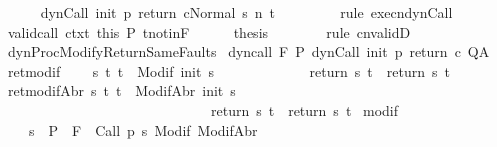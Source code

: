 \begin{isabellebody}
\ \ \ \ \isamarkupfalse%
\ {\isachardoublequoteopen}{\isasymGamma}{\isasymturnstile}{\isasymlangle}dynCall\ init\ p\ return{\isacharprime}\ c{\isacharcomma}Normal\ s{\isasymrangle}\ {\isacharequal}n{\isasymRightarrow}\ t{\isachardoublequoteclose}\ \isanewline
\ \ \ \ \ \ \isamarkupfalse%
\ {\isacharparenleft}rule\ execn{\isacharunderscore}dynCall{\isacharparenright}\isanewline
\ \ \ \ \isamarkupfalse%
\ valid{\isacharunderscore}call\ ctxt\ this\ P\ t{\isacharunderscore}notin{\isacharunderscore}F\isanewline
\ \ \ \ \isamarkupfalse%
\ {\isacharquery}thesis\isanewline
\ \ \ \ \ \ \isamarkupfalse%
\ {\isacharparenleft}rule\ cnvalidD{\isacharparenright}\isanewline
\ \ \isamarkupfalse%
\isanewline
{}\isamarkupfalse%
%
\endisatagproof
{\isafoldproof}%
%
\isadelimproof
\isanewline
%
\endisadelimproof
\isanewline
{}\isamarkupfalse%
\ dynProcModifyReturnSameFaults{\isacharcolon}\isanewline
{}\ dyn{\isacharunderscore}call{\isacharcolon}\ {\isachardoublequoteopen}{\isasymGamma}{\isacharcomma}{\isasymTheta}{\isasymturnstile}\isactrlbsub {\isacharslash}F\isactrlesub \ P\ dynCall\ init\ p\ return{\isacharprime}\ c\ Q{\isacharcomma}A{\isachardoublequoteclose}\isanewline
{}\ ret{\isacharunderscore}modif{\isacharcolon}\isanewline
\ \ \ \ {\isachardoublequoteopen}{\isasymforall}s\ t{\isachardot}\ t\ {\isasymin}\ Modif\ {\isacharparenleft}init\ s{\isacharparenright}\ \isanewline
\ \ \ \ \ \ \ \ \ \ \ {\isasymlongrightarrow}\ return{\isacharprime}\ s\ t\ {\isacharequal}\ return\ s\ t{\isachardoublequoteclose}\isanewline
{}\ ret{\isacharunderscore}modifAbr{\isacharcolon}\ {\isachardoublequoteopen}{\isasymforall}s\ t{\isachardot}\ t\ {\isasymin}\ ModifAbr\ {\isacharparenleft}init\ s{\isacharparenright}\ \isanewline
\ \ \ \ \ \ \ \ \ \ \ \ \ \ \ \ \ \ \ \ \ \ \ \ \ \ \ \ \ {\isasymlongrightarrow}\ return{\isacharprime}\ s\ t\ {\isacharequal}\ return\ s\ t{\isachardoublequoteclose}\isanewline
{}\ modif{\isacharcolon}\ \isanewline
\ \ \ \ {\isachardoublequoteopen}{\isasymforall}s\ {\isasymin}\ P{\isachardot}\ {\isasymforall}{\isasymsigma}{\isachardot}\ {\isasymGamma}{\isacharcomma}{\isasymTheta}{\isasymturnstile}\isactrlbsub {\isacharslash}F\isactrlesub \ {\isacharbraceleft}{\isasymsigma}{\isacharbraceright}\ Call\ {\isacharparenleft}p\ s{\isacharparenright}\ {\isacharparenleft}Modif\ {\isasymsigma}{\isacharparenright}{\isacharcomma}{\isacharparenleft}ModifAbr\ {\isasymsigma}{\isacharparenright}{\isachardoublequoteclose}\ \isanewline

\end{isabellebody}
